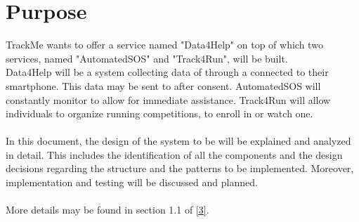 \documentclass[../../DD.tex]{subfiles}
\begin{document}
\section{Purpose}

	TrackMe wants to offer a service named "Data4Help" on top of which two services, named "AutomatedSOS" and "Track4Run", will be built.
	\\Data4Help will be a system collecting data of  through a  connected to their smartphone. This data may be sent to  after  consent.
	AutomatedSOS will constantly monitor  to allow for immediate assistance.
	Track4Run will allow individuals to organize running competitions, to enroll in or watch one.\\\\
	In this document, the design of the system to be will be explained and analyzed in detail. This includes the identification of all the components and the design decisions regarding the structure and the patterns to be implemented. Moreover, implementation and testing will be discussed and planned.\\\\
	More details may be found in section 1.1 of \hyperref[ref:3]{[3]}.
\end{document}
